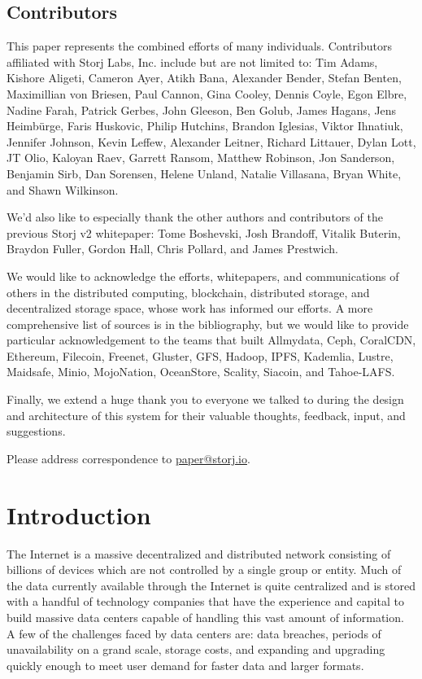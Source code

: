 \documentclass[8pt,fleqn,openany]{book}
\begin{document}
\section{Contributors}

This paper represents the combined efforts of many individuals.
Contributors affiliated with Storj Labs, Inc. include but are not limited to:
Tim Adams,
Kishore Aligeti,
Cameron Ayer,
Atikh Bana,
Alexander Bender,
Stefan Benten,
Maximillian von Briesen,
Paul Cannon,
Gina Cooley,
Dennis Coyle,
Egon Elbre,
Nadine Farah,
Patrick Gerbes,
John Gleeson,
Ben Golub,
James Hagans,
Jens Heimbürge,
Faris Huskovic,
Philip Hutchins,
Brandon Iglesias,
Viktor Ihnatiuk,
Jennifer Johnson,
Kevin Leffew,
Alexander Leitner,
Richard Littauer,
Dylan Lott,
JT Olio,
Kaloyan Raev,
Garrett Ransom,
Matthew Robinson,
Jon Sanderson,
Benjamin Sirb,
Dan Sorensen,
Helene Unland,
Natalie Villasana,
Bryan White,
and Shawn Wilkinson.

We'd also like to especially thank the other authors and contributors of the
previous Storj v2 whitepaper:
Tome Boshevski,
Josh Brandoff,
Vitalik Buterin,
Braydon Fuller,
Gordon Hall,
Chris Pollard,
and James Prestwich.

We would like to acknowledge the efforts, whitepapers, and communications of
others in the distributed computing, blockchain, distributed storage, and
decentralized storage space, whose work has informed our efforts. A more
comprehensive list of sources is in the bibliography, but we would like to
provide particular acknowledgement to the teams that built
Allmydata,
Ceph,
CoralCDN,
Ethereum,
Filecoin,
Freenet,
Gluster,
GFS,
Hadoop,
IPFS,
Kademlia,
Lustre,
Maidsafe,
Minio,
MojoNation,
OceanStore,
Scality,
Siacoin,
and Tahoe-LAFS.

Finally, we extend a huge thank you to everyone we talked to during the
design and architecture of this system for their valuable thoughts, feedback,
input, and suggestions.

Please address correspondence to \href{mailto:paper@storj.io}{paper@storj.io}.

\chapter{Introduction}\label{chap:intro}

The Internet is a massive decentralized and distributed network consisting of
billions of devices which are not controlled by a single group or entity.
Much of the data currently available through the Internet is quite centralized
and is stored with a handful of technology companies that have the
experience and capital to build massive data centers capable of handling this
vast amount of information.
A few of the challenges faced by data centers are: data breaches, periods of
unavailability on a grand scale, storage costs, and expanding and upgrading quickly enough to meet user demand for faster data and larger formats.
\end{document}
